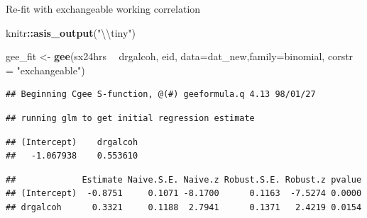 \documentclass[ignorenonframetext,]{beamer}
\newenvironment{Shaded}{\begin{snugshade}}{\end{snugshade}}
\newcommand{\KeywordTok}[1]{\textcolor[rgb]{0.13,0.29,0.53}{\textbf{#1}}}
\newcommand{\DataTypeTok}[1]{\textcolor[rgb]{0.13,0.29,0.53}{#1}}
\newcommand{\DecValTok}[1]{\textcolor[rgb]{0.00,0.00,0.81}{#1}}
\newcommand{\CharTok}[1]{\textcolor[rgb]{0.31,0.60,0.02}{#1}}
\newcommand{\StringTok}[1]{\textcolor[rgb]{0.31,0.60,0.02}{#1}}
\newcommand{\CommentTok}[1]{\textcolor[rgb]{0.56,0.35,0.01}{\textit{#1}}}
\newcommand{\OperatorTok}[1]{\textcolor[rgb]{0.81,0.36,0.00}{\textbf{#1}}}
\newcommand{\NormalTok}[1]{#1}
\begin{document}
\begin{frame}[fragile]{Re-fit with exchangeable working correlation}

\begin{Shaded}
\begin{Highlighting}[]
\NormalTok{knitr}\OperatorTok{::}\KeywordTok{asis_output}\NormalTok{(}\StringTok{"}\CharTok{\textbackslash{}\textbackslash{}}\StringTok{tiny"}\NormalTok{)}
\end{Highlighting}
\end{Shaded}

\tiny

\begin{Shaded}
\begin{Highlighting}[]
\NormalTok{gee_fit <-}\StringTok{ }\KeywordTok{gee}\NormalTok{(sx24hrs }\OperatorTok{~}\StringTok{ }\NormalTok{drgalcoh, eid, }\DataTypeTok{data=}\NormalTok{dat_new,}\DataTypeTok{family=}\NormalTok{binomial, }\DataTypeTok{corstr =} \StringTok{"exchangeable"}\NormalTok{)}
\end{Highlighting}
\end{Shaded}

\begin{verbatim}
## Beginning Cgee S-function, @(#) geeformula.q 4.13 98/01/27
\end{verbatim}

\begin{verbatim}
## running glm to get initial regression estimate
\end{verbatim}

\begin{verbatim}
## (Intercept)    drgalcoh 
##   -1.067938    0.553610
\end{verbatim}

\begin{Shaded}
\end{Shaded}

\begin{verbatim}
##             Estimate Naive.S.E. Naive.z Robust.S.E. Robust.z pvalue
## (Intercept)  -0.8751     0.1071 -8.1700      0.1163  -7.5274 0.0000
## drgalcoh      0.3321     0.1188  2.7941      0.1371   2.4219 0.0154
\end{verbatim}


\end{frame}
\end{document}
